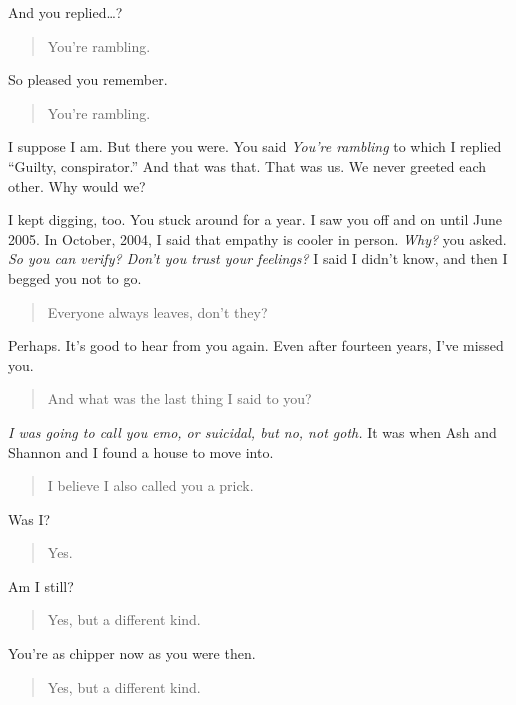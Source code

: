 And you replied\ldots{}?

\begin{quote}
You're rambling.
\end{quote}

So pleased you remember.

\begin{quote}
You're rambling.
\end{quote}

I suppose I am. But there you were. You said \emph{You're rambling} to which I replied ``Guilty, conspirator.'' And that was that. That was us. We never greeted each other. Why would we?

I kept digging, too. You stuck around for a year. I saw you off and on until June 2005. In October, 2004, I said that empathy is cooler in person. \emph{Why?} you asked. \emph{So you can verify? Don't you trust your feelings?} I said I didn't know, and then I begged you not to go.

\begin{quote}
Everyone always leaves, don't they?
\end{quote}

Perhaps. It's good to hear from you again. Even after fourteen years, I've missed you.

\begin{quote}
And what was the last thing I said to you?
\end{quote}

\emph{I was going to call you emo, or suicidal, but no, not goth.} It was when Ash and Shannon and I found a house to move into.

\begin{quote}
I believe I also called you a prick.
\end{quote}

Was I?

\begin{quote}
Yes.
\end{quote}

Am I still?

\begin{quote}
Yes, but a different kind.
\end{quote}

You're as chipper now as you were then.

\begin{quote}
Yes, but a different kind.
\end{quote}
